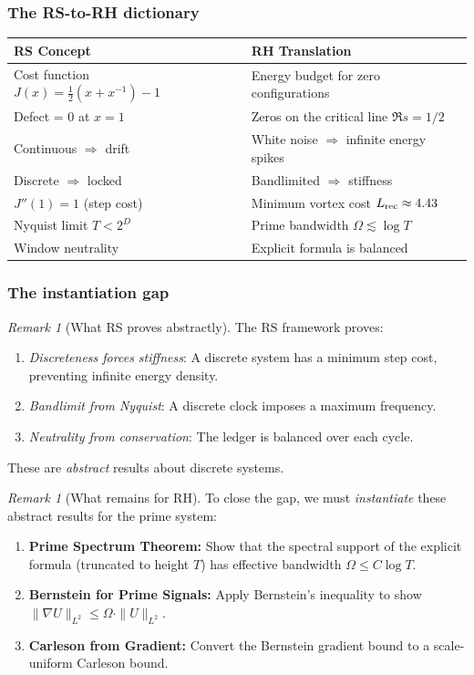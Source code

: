 \documentclass[11pt]{article}
\theoremstyle{definition}
\theoremstyle{remark}
\newtheorem{remark}[theorem]{Remark}
\theoremstyle{definition}
\begin{document}
\subsubsection*{The RS-to-RH dictionary}

\begin{center}
\begin{tabular}{|l|l|}
\hline
\textbf{RS Concept} & \textbf{RH Translation} \\
\hline
Cost function $J(x) = \tfrac{1}{2}(x + x^{-1}) - 1$ & Energy budget for zero configurations \\
Defect = 0 at $x = 1$ & Zeros on the critical line $\Re s = 1/2$ \\
Continuous $\Rightarrow$ drift & White noise $\Rightarrow$ infinite energy spikes \\
Discrete $\Rightarrow$ locked & Bandlimited $\Rightarrow$ stiffness \\
$J''(1) = 1$ (step cost) & Minimum vortex cost $L_{\rm rec} \approx 4.43$ \\
Nyquist limit $T < 2^D$ & Prime bandwidth $\Omega \lesssim \log T$ \\
Window neutrality & Explicit formula is balanced \\
\hline
\end{tabular}
\end{center}

\subsubsection*{The instantiation gap}

\begin{remark}[What RS proves abstractly]
The RS framework proves:
\begin{enumerate}
\item \emph{Discreteness forces stiffness}: A discrete system has a minimum step cost, preventing infinite energy density.
\item \emph{Bandlimit from Nyquist}: A discrete clock imposes a maximum frequency.
\item \emph{Neutrality from conservation}: The ledger is balanced over each cycle.
\end{enumerate}
These are \emph{abstract} results about discrete systems.
\end{remark}

\begin{remark}[What remains for RH]
To close the gap, we must \emph{instantiate} these abstract results for the prime system:
\begin{enumerate}
\item \textbf{Prime Spectrum Theorem:} Show that the spectral support of the explicit formula (truncated to height $T$) has effective bandwidth $\Omega \le C\log T$.
\item \textbf{Bernstein for Prime Signals:} Apply Bernstein's inequality to show $\|\nabla U\|_{L^2} \le \Omega \cdot \|U\|_{L^2}$.
\item \textbf{Carleson from Gradient:} Convert the Bernstein gradient bound to a scale-uniform Carleson bound.
\end{enumerate}
\end{remark}
\end{document}
